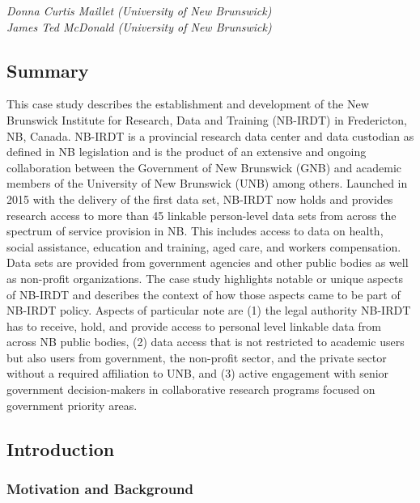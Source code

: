 \documentclass[
]{WileySix}
\begin{document}
\emph{Donna Curtis Maillet (University of New Brunswick)}\\
\emph{James Ted McDonald (University of New Brunswick)}

\hypertarget{summary-3}{%
\subsection{Summary}\label{summary-3}}

This case study describes the establishment and development of the New Brunswick Institute for Research, Data and Training (NB-IRDT) in Fredericton, NB, Canada. NB-IRDT is a provincial research data center and data custodian as defined in NB legislation and is the product of an extensive and ongoing collaboration between the Government of New Brunswick (GNB) and academic members of the University of New Brunswick (UNB) among others. Launched in 2015 with the delivery of the first data set, NB-IRDT now holds and provides research access to more than 45 linkable person-level data sets from across the spectrum of service provision in NB. This includes access to data on health, social assistance, education and training, aged care, and workers compensation. Data sets are provided from government agencies and other public bodies as well as non-profit organizations. The case study highlights notable or unique aspects of NB-IRDT and describes the context of how those aspects came to be part of NB-IRDT policy. Aspects of particular note are (1) the legal authority NB-IRDT has to receive, hold, and provide access to personal level linkable data from across NB public bodies, (2) data access that is not restricted to academic users but also users from government, the non-profit sector, and the private sector without a required affiliation to UNB, and (3) active engagement with senior government decision-makers in collaborative research programs focused on government priority areas.

\hypertarget{introduction-3}{%
\subsection{Introduction}\label{introduction-3}}

\hypertarget{motivation-and-background-2}{%
\subsubsection{Motivation and Background}\label{motivation-and-background-2}}
\end{document}
